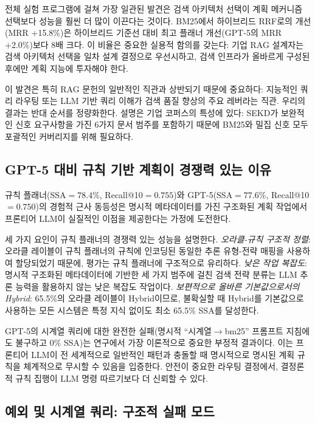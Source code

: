 \documentclass[11pt, a4paper]{article}
\begin{document}
전체 실험 프로그램에 걸쳐 가장 일관된 발견은 검색 아키텍처 선택이 계획 메커니즘 선택보다 성능을 훨씬 더 많이 이끈다는 것이다. BM25에서 하이브리드 RRF로의 개선(MRR +15.8\%)은 하이브리드 기준선 대비 최고 플래너 개선(GPT-5의 MRR +2.0\%)보다 8배 크다. 이 비율은 중요한 실용적 함의를 갖는다: 기업 RAG 설계자는 검색 아키텍처 선택을 일차 설계 결정으로 우선시하고, 검색 인프라가 올바르게 구성된 후에만 계획 지능에 투자해야 한다.

이 발견은 특히 RAG 문헌의 일반적인 직관과 상반되기 때문에 중요하다: 지능적인 쿼리 라우팅 또는 LLM 기반 쿼리 이해가 검색 품질 향상의 주요 레버라는 직관. 우리의 결과는 반대 순서를 정량화한다. 설명은 기업 코퍼스의 특성에 있다: SEKD가 보완적인 신호 요구사항을 가진 6가지 문서 범주를 포함하기 때문에 BM25와 밀집 신호 모두 포괄적인 커버리지를 위해 필요하다.

\subsection{GPT-5 대비 규칙 기반 계획이 경쟁력 있는 이유}

규칙 플래너(SSA$={78.4\%}$, Recall@10$={0.755}$)와 GPT-5(SSA$={77.6\%}$, Recall@10$={0.750}$)의 경험적 근사 동등성은 명시적 메타데이터를 가진 구조화된 계획 작업에서 프론티어 LLM이 실질적인 이점을 제공한다는 가정에 도전한다.

세 가지 요인이 규칙 플래너의 경쟁력 있는 성능을 설명한다. \textit{오라클-규칙 구조적 정렬}: 오라클 레이블이 규칙 플래너의 규칙에 인코딩된 동일한 추론 유형-전략 매핑을 사용하여 할당되었기 때문에, 평가는 규칙 플래너에 구조적으로 유리하다. \textit{낮은 작업 복잡도}: 명시적 구조화된 메타데이터에 기반한 세 가지 범주에 걸친 검색 전략 분류는 LLM 추론 능력을 활용하지 않는 낮은 복잡도 작업이다. \textit{보편적으로 올바른 기본값으로서의 Hybrid}: 65.5\%의 오라클 레이블이 Hybrid이므로, 불확실할 때 Hybrid를 기본값으로 사용하는 모든 시스템은 특정 지식 없이도 최소 65.5\% SSA를 달성한다.

GPT-5의 시계열 쿼리에 대한 완전한 실패(명시적 ``시계열$\to$bm25'' 프롬프트 지침에도 불구하고 0\% SSA)는 연구에서 가장 이론적으로 중요한 부정적 결과이다. 이는 프론티어 LLM이 전 세계적으로 일반적인 패턴과 충돌할 때 명시적으로 명시된 계획 규칙을 체계적으로 무시할 수 있음을 입증한다. 안전이 중요한 라우팅 결정에서, 결정론적 규칙 집행이 LLM 명령 따르기보다 더 신뢰할 수 있다.

\subsection{예외 및 시계열 쿼리: 구조적 실패 모드}
\end{document}
